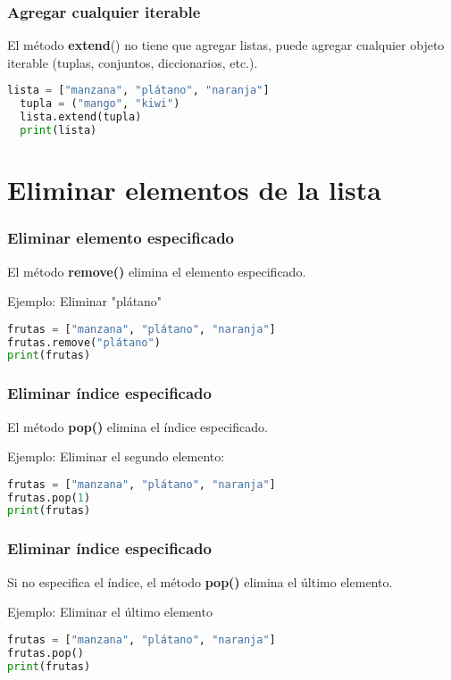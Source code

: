 \begin{frame}[fragile]
  \frametitle{Agregar cualquier iterable}

  El método \textbf{extend}() no tiene que agregar listas,
  puede agregar cualquier objeto iterable
  (tuplas, conjuntos, diccionarios, etc.).

  \vspace{\baselineskip}
  \begin{lstlisting}[language=Python]
  lista = ["manzana", "plátano", "naranja"]
  tupla = ("mango", "kiwi")
  lista.extend(tupla)
  print(lista)
  \end{lstlisting}
\end{frame}

\section{Eliminar elementos de la lista}

\begin{frame}[fragile]
  \frametitle{Eliminar elemento especificado}

  El método \textbf{remove()} elimina el elemento especificado.

  \vspace{\baselineskip}
  Ejemplo: Eliminar "plátano"
  \begin{lstlisting}[language=Python]
frutas = ["manzana", "plátano", "naranja"]
frutas.remove("plátano")
print(frutas)
  \end{lstlisting}
\end{frame}

\begin{frame}[fragile]
  \frametitle{Eliminar índice especificado}

  El método \textbf{pop()} elimina el índice especificado.

  \vspace{\baselineskip}
  Ejemplo: Eliminar el segundo elemento:
  \begin{lstlisting}[language=Python]
frutas = ["manzana", "plátano", "naranja"]
frutas.pop(1)
print(frutas)
  \end{lstlisting}
\end{frame}

\begin{frame}[fragile]
  \frametitle{Eliminar índice especificado}

  Si no especifica el índice, el método \textbf{pop()} elimina
  el último elemento.

  \vspace{\baselineskip}
  Ejemplo: Eliminar el último elemento
  \begin{lstlisting}[language=Python]
frutas = ["manzana", "plátano", "naranja"]
frutas.pop()
print(frutas)
  \end{lstlisting}
\end{frame}

